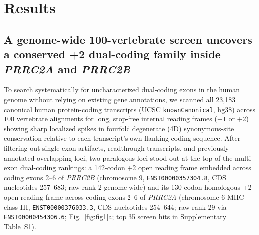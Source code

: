 \documentclass[10pt,letterpaper]{article}
\newcommand{\gene}[1]{\textit{#1}}
\begin{document}
\section{Results}

\subsection{A genome-wide 100-vertebrate screen uncovers a conserved +2 dual-coding family inside \gene{PRRC2A} and \gene{PRRC2B}}

To search systematically for uncharacterized dual-coding exons in the human genome without relying on existing gene annotations, we scanned all 23,183 canonical human protein-coding transcripts (UCSC \texttt{knownCanonical}, hg38) across 100 vertebrate alignments for long, stop-free internal reading frames (+1 or +2) showing sharp localized spikes in fourfold degenerate (4D) synonymous-site conservation relative to each transcript's own flanking coding sequence. After filtering out single-exon artifacts, readthrough transcripts, and previously annotated overlapping loci, two paralogous loci stood out at the top of the multi-exon dual-coding rankings: a 142-codon +2 open reading frame embedded across coding exons 2--6 of \gene{PRRC2B} (chromosome 9, \texttt{ENST00000357304.8}, CDS nucleotides 257--683; raw rank 2 genome-wide) and its 130-codon homologous +2 open reading frame across coding exons 2--6 of \gene{PRRC2A} (chromosome 6 MHC class III, \texttt{ENST00000376033.3}, CDS nucleotides 254--644; raw rank 29 via \texttt{ENST00000454306.6}; Fig.~\ref{fig:fig1}a; top 35 screen hits in Supplementary Table~S1).
\end{document}
